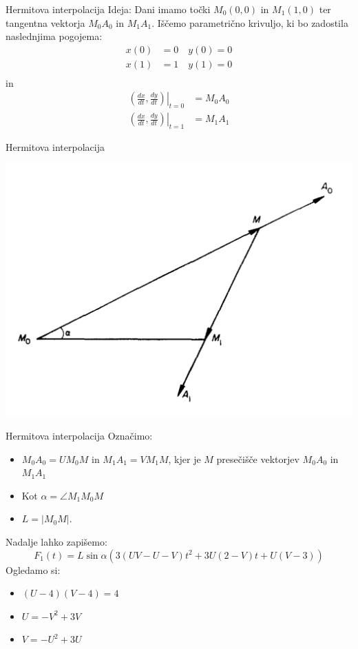 \documentclass{beamer} %
\begin{document}
\begin{frame}{Hermitova interpolacija}
	Ideja: Dani imamo točki $M_0 (0,0)$ in $M_1 (1,0)$ ter tangentna vektorja $M_0A_0$ in $M_1A_1$. Iščemo parametrično krivuljo, ki bo zadostila naslednjima pogojema:
	\begin{align*}
		x(0) &= 0 \quad y(0) = 0 \\
		x(1) &= 1 \quad y(1) = 0 \\
	\end{align*}
in
	\begin{align*}
		 \left. \left(\frac{dx}{dt},\frac{dy}{dt}\right)\right|_{t=0} &= M_0A_0 \\
		\left.\left(\frac{dx}{dt},\frac{dy}{dt}\right)\right|_{t=1} &= M_1A_1
	\end{align*}
	 
\end{frame}

\begin{frame}{Hermitova interpolacija}
	\begin{center}
	\includegraphics[width=0.6\columnwidth]{hermit.jpg}
	\end{center}
\end{frame}

\begin{frame}{Hermitova interpolacija}
	Označimo:
	\begin{itemize}
		\item $ M_0A_0=UM_0M$ in  $M_1A_1 = VM_1M$,
		kjer je $M$ presečišče vektorjev $M_0A_0$ in $M_1A_1$
		\item Kot $\alpha =  \angle M_1M_0M$
		\item $L = |M_0M|$.
	\end{itemize}
	Nadalje lahko zapišemo:
	\[ F_1(t) =L\sin\alpha(3(UV-U-V)t^2 +3U(2-V)t+ U(V-3)) \]
	Ogledamo si:
	\begin{itemize}
		\item $(U-4)(V-4)=4$
		\item $U = -V^2 +3V$
		\item $V = -U^2 + 3U$
	\end{itemize}
	
\end{frame}
\end{document}
